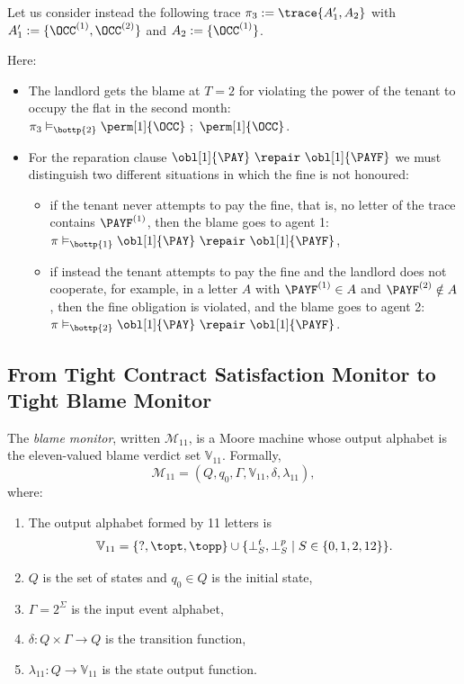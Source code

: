 \begin{example}
Let us consider instead the following trace $\pi_3:=\trace{A_1',A_2}$ with $A_1':= \{\OCC^{(1)}, \OCC^{(2)}\}$ and $A_2:= \{\OCC^{(1)}\}$.

Here:
\begin{itemize}
\item The landlord gets the blame at $T=2$ for violating the power of the tenant to occupy the flat in the second month:\\
$\pi_3 \vDash_{\bottp{2}} \perm[1]{\OCC}\ ;\ \perm[1]{\OCC} $.
\item For the reparation clause $\obl[1]{\PAY}\ \repair\ \obl[1]{\PAYF}$ we must distinguish two different situations in which the fine is not honoured:
  \begin{itemize}
    \item if the tenant never attempts to pay the fine, that is, no letter of the trace contains $\PAYF^{(1)}$, then the blame goes to agent 1:\\
    $\pi \vDash_{\bottp{1}} \obl[1]{\PAY}\ \repair\ \obl[1]{\PAYF}$,
    \item if instead the tenant attempts to pay the fine and the landlord does not cooperate, for example, in a letter $A$ with $\PAYF^{(1)}\in A$ and $\PAYF^{(2)}\notin A$, then the fine obligation is violated, and the blame goes to agent 2:\\
    $\pi \vDash_{\bottp{2}} \obl[1]{\PAY}\ \repair\ \obl[1]{\PAYF}$.
  \end{itemize}
\end{itemize}
\end{example}
\subsection{From Tight Contract Satisfaction Monitor to Tight Blame Monitor}

\begin{definition}
\label{def:blamemonitor}
The \emph{blame monitor}, written $\mathcal{M}_{11}$, is a Moore machine whose
output alphabet is the eleven-valued blame verdict set $\mathbb{V}_{11}$.
Formally,
\[
\mathcal{M}_{11} = (Q,q_0,\Gamma,\mathbb{V}_{11},\delta,\lambda_{11}),
\]
where:
\begin{enumerate}
  \item The output alphabet formed by 11 letters is
  \[
  \mathbb{V}_{11}
      = \{\mathsf{?},\topt,\topp\}
        \cup \{\bot^{t}_{S},\bot^{p}_{S} \mid S\in\{0,1,2,12\}\}.
  \]
  \item $Q$ is the set of states and $q_0\in Q$ is the initial state,
  \item $\Gamma = 2^\Sigma$ is the input event alphabet,
  \item $\delta: Q \times \Gamma \to Q$ is the transition function,
  \item $\lambda_{11}: Q \to \mathbb{V}_{11}$ is the state output function.
\end{enumerate}
\end{definition}

